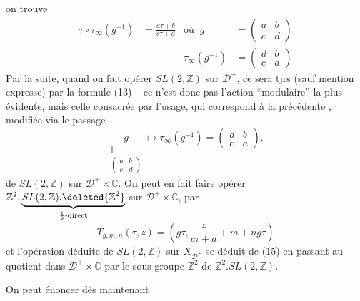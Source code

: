 on trouve
\[
\begin{aligned}
\tau\circ\tau_\infty(g^{-1})&=\frac{a\tau+b}{c\tau+d}
&\text{où }\ g&=\begin{pmatrix}a&b\\c&d\end{pmatrix}\\
&&\tau_\infty(g^{-1})&=\begin{pmatrix}d&b\\c&a\end{pmatrix}
\end{aligned}\tag*{(13)}
\]
Par la suite, quand on fait opérer $SL(2,\mathbb Z)$ sur $\mathcal D^+$, ce sera tjrs (sauf mention expresse) par la formule (13) -- ce n'est donc pas l'action ``modulaire'' la plus évidente, mais celle consacrée par l'usage, qui correspond à la précédente , modifiée via le passage
\[
\underset{\substack{\Vert\\\left(\begin{smallmatrix}a&b\\c&d\end{smallmatrix}\right)}}g\longmapsto\tau_\infty(g^{-1})=\begin{pmatrix}d&b\\c&a\end{pmatrix}.
\]
de $SL(2,\mathbb Z)$ sur $\mathcal D^+\times\mathbb C$. On peut en fait faire opérer $\mathbb Z^2.\underbrace{SL(2,\mathbb Z).\deleted{\mathbb Z^2}}_{\text{$\frac12$-direct}}$ sur $\mathcal D^+\times\mathbb C$, par
\[
T_{g,m,n}(\tau,z)=\left(g\tau,\frac{z}{c\tau+d}+m+ng\tau\right) \tag*{(15)}
\]
et l'opération déduite de $SL(2,\mathbb Z)$ sur $X_{\mathcal D^+}$ se déduit de (15) en passant au quotient  dans $\mathcal D^+\times\mathbb C$ par le sous-groupe $\mathbb Z^2$ de $\mathbb Z^2.SL(2,\mathbb Z)$.

On peut énoncer dès maintenant

